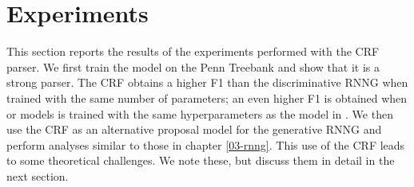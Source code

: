 
\section{Experiments}
  This section reports the results of the experiments performed with the CRF parser. We first train the model on the Penn Treebank and show that it is a strong parser. The CRF obtains a higher F1 than the discriminative RNNG when trained with the same number of parameters; an even higher F1 is obtained when or models is trained with the same hyperparameters as the model in \citet{stern2017minimal}. We then use the CRF as an alternative proposal model for the generative RNNG and perform analyses similar to those in chapter \ref{03-rnng}. This use of the CRF leads to some theoretical challenges. We note these, but discuss them in detail in the next section.

